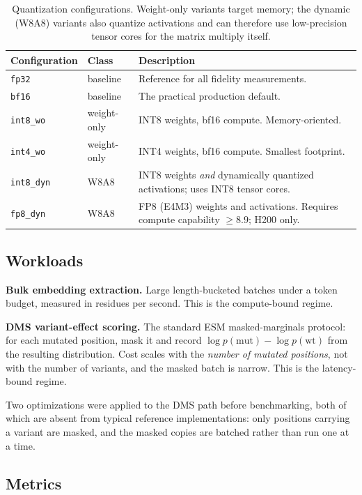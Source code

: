 \documentclass[11pt]{article}
\newcommand{\cfg}[1]{\texttt{#1}}
\begin{document}
\begin{table}[htb]
\centering
\caption{Quantization configurations. Weight-only variants target memory; the
dynamic (W8A8) variants also quantize activations and can therefore use
low-precision tensor cores for the matrix multiply itself.}
\small
\begin{tabular}{llp{7.4cm}}
\toprule
Configuration & Class & Description \\
\midrule
\cfg{fp32}     & baseline    & Reference for all fidelity measurements. \\
\cfg{bf16}     & baseline    & The practical production default. \\
\cfg{int8\_wo} & weight-only & INT8 weights, bf16 compute. Memory-oriented. \\
\cfg{int4\_wo} & weight-only & INT4 weights, bf16 compute. Smallest footprint. \\
\cfg{int8\_dyn}& W8A8        & INT8 weights \emph{and} dynamically quantized
                               activations; uses INT8 tensor cores. \\
\cfg{fp8\_dyn} & W8A8        & FP8 (E4M3) weights and activations. Requires
                               compute capability $\geq 8.9$; H200 only. \\
\bottomrule
\end{tabular}
\end{table}

\subsection{Workloads}

\textbf{Bulk embedding extraction.} Large length-bucketed batches under a token
budget, measured in residues per second. This is the compute-bound regime.

\textbf{DMS variant-effect scoring.} The standard ESM masked-marginals protocol:
for each mutated position, mask it and record
$\log p(\text{mut}) - \log p(\text{wt})$ from the resulting distribution. Cost
scales with the \emph{number of mutated positions}, not with the number of
variants, and the masked batch is narrow. This is the latency-bound regime.

Two optimizations were applied to the DMS path before benchmarking, both of
which are absent from typical reference implementations: only positions
carrying a variant are masked, and the masked copies are batched rather than
run one at a time.

\subsection{Metrics}
\end{document}
